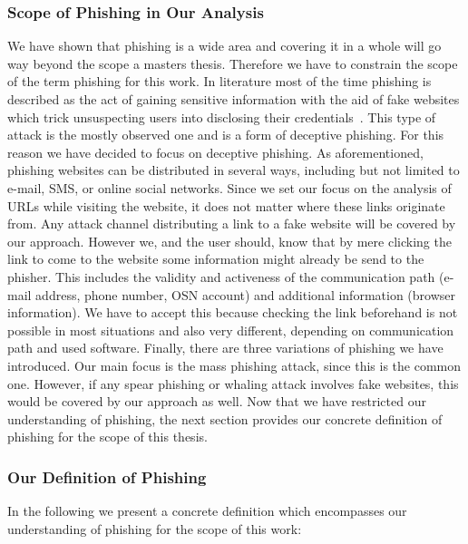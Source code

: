 \subsubsection{Scope of Phishing in Our Analysis}
\label{s:scope}
We have shown that phishing is a wide area and covering it in a whole will go way beyond the scope a masters thesis. Therefore we have to constrain the scope of the term phishing for this work.
 In literature most of the time phishing is described as the act of gaining sensitive information with the aid of fake websites which trick unsuspecting users into disclosing their credentials~\cite{sheng2007antiphishingphil, antiphishingtrendreport2013, kasperskyreport2013}.
This type of attack is the mostly observed one and is a form of deceptive phishing.
 For this reason we have decided to focus on deceptive phishing.
 As aforementioned, phishing websites can be distributed in several ways, including but not limited to e-mail, SMS, or online social networks.
 Since we set our focus on the analysis of URLs while visiting the website, it does not matter where these links originate from.
 Any attack channel distributing a link to a fake website will be covered by our approach.
 However we, and the user should, know that by mere clicking the link to come to the website some information might already be send to the phisher.
 This includes the validity and activeness of the communication path (e-mail address, phone number, OSN account) and additional information (browser information). We have to accept this because checking the link beforehand is not possible in most situations and also very different, depending on communication path and used software.
  Finally, there are three variations of phishing we have introduced.
 Our main focus is the mass phishing attack, since this is the common one.
 However, if any spear phishing or whaling attack involves fake websites, this would be covered by our approach as well.
Now that we have restricted our understanding of phishing, the next section provides our concrete definition of phishing for the scope of this thesis.

\subsubsection{Our Definition of Phishing}
In the following we present a concrete definition which encompasses our understanding of phishing for the scope of this work:

